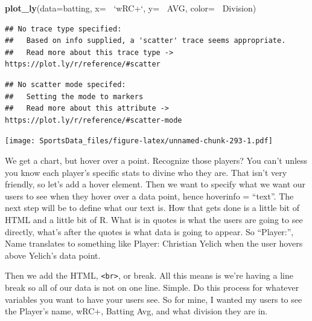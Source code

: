 \documentclass[
]{book}
\newenvironment{Shaded}{\begin{snugshade}}{\end{snugshade}}
\newcommand{\DataTypeTok}[1]{\textcolor[rgb]{0.13,0.29,0.53}{#1}}
\newcommand{\KeywordTok}[1]{\textcolor[rgb]{0.13,0.29,0.53}{\textbf{#1}}}
\newcommand{\NormalTok}[1]{#1}
\newcommand{\OperatorTok}[1]{\textcolor[rgb]{0.81,0.36,0.00}{\textbf{#1}}}
\newcommand{\StringTok}[1]{\textcolor[rgb]{0.31,0.60,0.02}{#1}}
\begin{document}
\begin{Shaded}
\begin{Highlighting}[]
\KeywordTok{plot_ly}\NormalTok{(}\DataTypeTok{data=}\NormalTok{batting, }\DataTypeTok{x=} \OperatorTok{~}\StringTok{`}\DataTypeTok{wRC+}\StringTok{`}\NormalTok{, }\DataTypeTok{y=} \OperatorTok{~}\NormalTok{AVG, }\DataTypeTok{color=} \OperatorTok{~}\NormalTok{Division)}
\end{Highlighting}
\end{Shaded}

\begin{verbatim}
## No trace type specified:
##   Based on info supplied, a 'scatter' trace seems appropriate.
##   Read more about this trace type -> https://plot.ly/r/reference/#scatter
\end{verbatim}

\begin{verbatim}
## No scatter mode specifed:
##   Setting the mode to markers
##   Read more about this attribute -> https://plot.ly/r/reference/#scatter-mode
\end{verbatim}

\texttt{[image: SportsData\_files/figure-latex/unnamed-chunk-293-1.pdf]}

We get a chart, but hover over a point. Recognize those players? You can't unless you know each player's specific stats to divine who they are. That isn't very friendly, so let's add a hover element. Then we want to specify what we want our users to see when they hover over a data point, hence hoverinfo = ``text''. The next step will be to define what our text is. How that gets done is a little bit of HTML and a little bit of R. What is in quotes is what the users are going to see directly, what's after the quotes is what data is going to appear. So ``Player:'', Name translates to something like Player: Christian Yelich when the user hovers above Yelich's data point.

Then we add the HTML, \texttt{\textless{}br\textgreater{}}, or break. All this means is we're having a line break so all of our data is not on one line. Simple. Do this process for whatever variables you want to have your users see. So for mine, I wanted my users to see the Player's name, wRC+, Batting Avg, and what division they are in.
\end{document}

